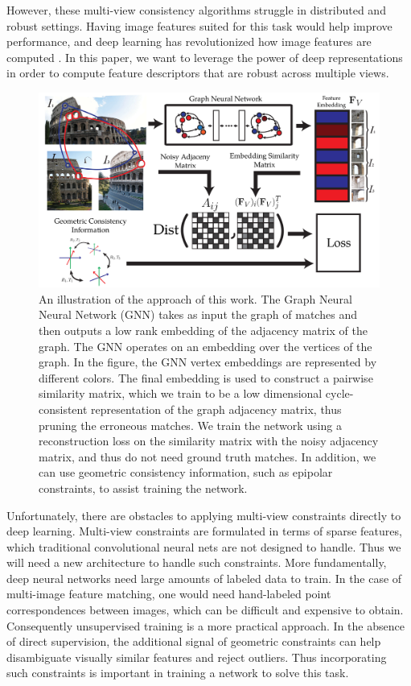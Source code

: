 \documentclass{article} %
\begin{document}
However, these multi-view consistency algorithms struggle in distributed and robust settings.
Having image features suited for this task would help improve performance, and deep learning has revolutionized how image features are computed \citep{yi2016lift}.
In this paper, we want to leverage the power of deep representations in order to compute feature descriptors that are robust across multiple views.

\begin{figure}[t]
\begin{center}
  \includegraphics[width=0.8\linewidth]{figures-CycleConsistencyMainFigure-v4.pdf}
\end{center}
  \caption{
    An illustration of the approach of this work.
    The Graph Neural Neural Network (GNN) \citep{battaglia2018relational} takes as input the graph of matches and then outputs a low rank embedding of the adjacency matrix of the graph.
    The GNN operates on an embedding over the vertices of the graph.
    In the figure, the GNN vertex embeddings are represented by different colors.
    The final embedding is used to construct a pairwise similarity matrix, which we train to be a low dimensional cycle-consistent representation of the graph adjacency matrix, thus pruning the erroneous matches.
    We train the network using a reconstruction loss on the similarity matrix with the noisy adjacency matrix, and thus do not need ground truth matches.
    In addition, we can use geometric consistency information, such as epipolar constraints, to assist training the network.
  }
\label{fig:pipeline}
\end{figure}

Unfortunately, there are obstacles to applying multi-view constraints directly to deep learning. 
Multi-view constraints are formulated in terms of sparse features, which traditional convolutional neural nets are not designed to handle.
Thus we will need a new architecture to handle such constraints.
More fundamentally, deep neural networks need large amounts of labeled data to train.
In the case of multi-image feature matching, one would need hand-labeled point correspondences between images, which can be difficult and expensive to obtain.
Consequently unsupervised training is a more practical approach.
In the absence of direct supervision, the additional signal of geometric constraints can help disambiguate visually similar features and reject outliers.
Thus incorporating such constraints is important in training a network to solve this task.
\end{document}
